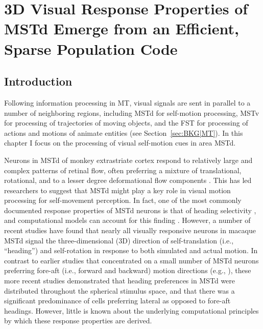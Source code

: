 \chapter{3D Visual Response Properties of MSTd Emerge from an Efficient, Sparse
Population Code}
\label{ch:MSTd}

\section{Introduction}

Following information processing in \ac{MT}, 
visual signals are sent in parallel to a number of neighboring regions, 
including \acf{MSTd} for self-motion processing,
\acf{MSTv} for processing of trajectories of moving objects, and the \acf{FST}
for processing of actions and motions of animate entities \citep{Orban2008}
(see Section~\ref{sec:BKG|MT}).
In this chapter I focus on the processing of visual self-motion cues
in area \ac{MSTd}.

Neurons in \acf{MSTd} of 
monkey extrastriate cortex respond to 
relatively large and complex patterns of retinal flow, 
often preferring a mixture of translational, rotational, and to a lesser degree 
deformational flow components 
\citep{Saito1986,TanakaSaito1989,DuffyWurtz1991a,Orban1992,Lagae1994,Mineault2012}.
This has led researchers to suggest that \ac{MSTd} might play a key role in visual motion
processing for self-movement perception. In fact, one of the most commonly documented 
response properties of \ac{MSTd} neurons is that of heading selectivity
\citep{TanakaSaito1989,DuffyWurtz1995,Lappe1996,BrittenVanWezel2002,PageDuffy2003,Gu2006,LoganDuffy2006,Gu2012}, and computational models can account for this finding
\citep{Perrone1992,Zhang1993,PerroneStone1994,PerroneStone1998,Lappe1996,BeintemaVanDenBerg1998,BeintemaVanDenBerg2000,ZemelSejnowski1998}.
However, a number of recent studies have found that nearly all visually responsive neurons 
in macaque MSTd signal the three-dimensional (3D) direction of self-translation 
(i.e., ``heading'') \citep{Gu2006,LoganDuffy2006,Gu2012}
and self-rotation \citep{Takahashi2007} in response to both simulated and actual motion.
In contrast to earlier studies that concentrated on a small number of MSTd neurons 
preferring fore-aft (i.e., forward and backward) motion directions 
(e.g., \cite{DuffyWurtz1995}), these more recent studies demonstrated that 
heading preferences in MSTd were distributed throughout the spherical stimulus space, 
and that there was a significant predominance of cells preferring lateral as opposed 
to fore-aft headings. However, little is known about the underlying computational 
principles by which these response properties are derived. 

